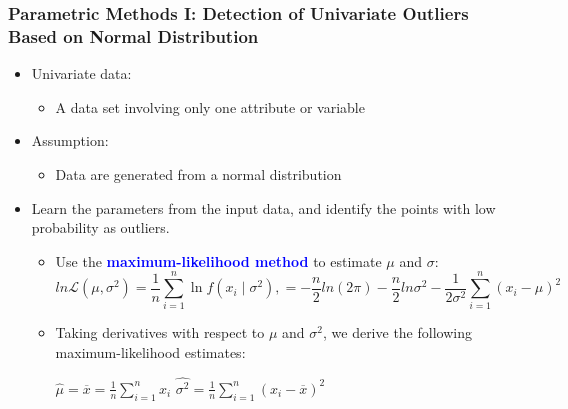 \documentclass[aspectratio=169,t,xcolor=dvipsnames]{beamer}
\newcommand{\blue}[1]{\textbf{\textcolor{blue}{#1}}}
\begin{document}
%

\begin{frame}
	\frametitle{Parametric Methods I: Detection of Univariate Outliers Based on Normal Distribution}
	\begin{itemize}
		\item Univariate data:
		      \begin{itemize}
		      	\item A data set involving only one attribute or variable
		      \end{itemize}
		\item Assumption:
		      \begin{itemize}
		      	\item Data are generated from a normal distribution
		      \end{itemize}
		\item Learn the parameters from the input data, and identify the points with low probability as outliers.
		      \begin{itemize}
		      	\item Use the \blue{maximum-likelihood method} to estimate $\mu$ and $\sigma$:
		      	$$
		      	ln\mathcal{L}(\mu, \sigma^2)= 
		      	\frac1n \sum_{i=1}^n \ln f(x_i \mid \sigma^2), = 
		      	-\frac{n}{2}ln(2\pi)-\frac{n}{2}ln \sigma^2 - \frac{1}{2 \sigma^2} \sum_{i=1}^n(x_i - \mu)^2 
		      	$$
		      	\item Taking derivatives with respect to $\mu$ and $\sigma^2$, we derive the following maximum-likelihood estimates:
		      	
				 \qquad \qquad$\widehat{\mu}=\overline{x}= \frac{1}{n} \sum_{i=1}^n x_i$ \qquad $\widehat{\sigma^2} = \frac{1}{n} \sum_{i=1}^n (x_i-\overline{x})^2$ 
		      	
		      	
		      \end{itemize}
	\end{itemize}
\end{frame}

%
\end{document}
